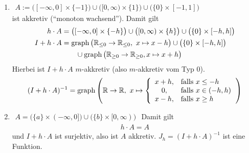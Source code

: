 \begin{beispiel}[Beispiele für $X=\R$]\
	\begin{enumerate}[label=(\alph*)]
		\item $\begin{aligned}
			A:=\big([-\infty,0]\times\lbrace-1\rbrace\big)\cup\big([0,\infty)\times\lbrace 1\rbrace\big)\cup\big(\lbrace0\rbrace\times[-1,1]\big)
		\end{aligned}$\\
		ist akkretiv (``monoton wachsend''). Damit gilt
		\begin{align*}
			h\cdot A&=\big([-\infty,0]\times\lbrace-h\rbrace\big)\cup\big([0,\infty)\times\lbrace h\rbrace\big)\cup\big(\lbrace0\rbrace\times[-h,h]\big)\\
			I+h\cdot A&=\operatorname{graph}\big(\mathbb{R}_{\leq0}\to\mathbb{R}_{\leq0},~x\mapsto x-h\big)\cup\big(\lbrace 0\rbrace\times [-h,h]\big)\\
			&\qquad\cup\operatorname{graph}\big(\mathbb{R}_{\geq0}\to\mathbb{R}_{\geq0},x\mapsto x+h\big)
		\end{align*}
		Hierbei ist $I+h\cdot A$ $m$-akkretiv (also $m$-akkretiv vom Typ 0).
		\begin{align*}
			(I+h\cdot A)^{-1}=\operatorname{graph}\left(\mathbb{R}\to\mathbb{R},~x\mapsto\left\lbrace\begin{array}{cl}
				x+h, & \text{falls } x\leq -h\\
				0, & \text{falls } x\in(-h,h)\\
				x-h, & \text{falls } x\geq h
			\end{array}\right.\right)
		\end{align*}
		\item $\begin{aligned}
			A=\big(\lbrace a\rbrace\times (-\infty,0]\big)\cup\big(\lbrace b\rbrace\times[0,\infty)\big)
		\end{aligned}$
		Damit gilt
		\begin{align*}
			h\cdot A=A
		\end{align*}
		und $I+h\cdot A$ ist surjektiv, also ist $A$ akkretiv. $J_h=(I+h\cdot A)^{-1}$ ist eine Funktion.
	\end{enumerate}
\end{beispiel}

